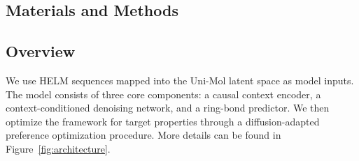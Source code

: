\begin{methods}
\section{Materials and Methods}\label{sec:methods}

\subsection{Overview}\label{subsec:overview}

We use HELM sequences mapped into the Uni-Mol latent space as model inputs. The model consists of three core components: a causal context encoder, a context-conditioned denoising network, and a ring-bond predictor. We then optimize the framework for target properties through a diffusion-adapted preference optimization procedure. More details can be found in Figure~\ref{fig:architecture}.


\end{methods}
